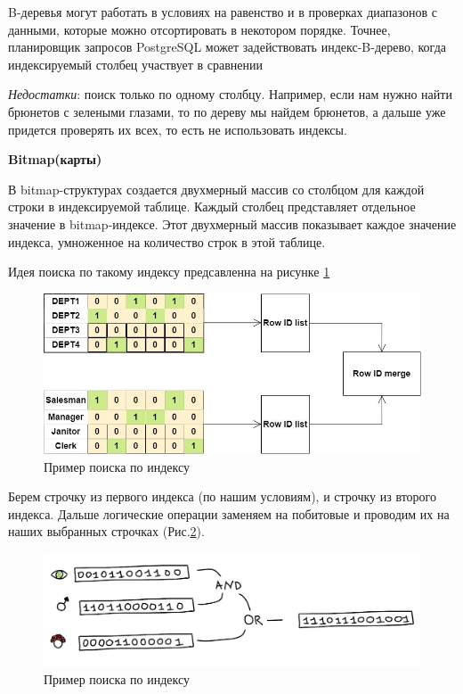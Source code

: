 B-деревья могут работать в условиях на равенство и в проверках диапазонов с данными, которые можно отсортировать в некотором порядке. Точнее, планировщик запросов PostgreSQL может задействовать индекс-B-дерево, когда индексируемый столбец участвует в сравнении 

\textit{Недостатки}: поиск только по одному столбцу. Например, если нам нужно найти брюнетов с зелеными глазами, то по дереву мы найдем брюнетов, а дальше уже придется проверять их всех, то есть не использовать индексы. 

\textbf{Bitmap(карты)} 

В bitmap-структурах создается двухмерный массив со столбцом для каждой строки в индексируемой таблице. Каждый столбец представляет отдельное значение в bitmap-индексе. Этот двухмерный массив показывает каждое значение индекса, умноженное на количество строк в этой таблице.

Идея поиска по такому индексу предсавленна на рисунке \ref{fig:Map}  

\begin{figure}[!h]
    \centering
    \includegraphics[scale = 0.5]{4/Index.jpg}
    \caption{Пример поиска по индексу}
    \label{fig:Map}
\end{figure}


Берем строчку из первого индекса (по нашим условиям), и строчку из второго индекса. Дальше логические операции заменяем на побитовые и проводим их на наших выбранных строчках (Рис.\ref{fig:BMap}).

\begin{figure}[!h]
    \centering
    \includegraphics[scale = 0.4]{4/BitMat.png}
    \caption{Пример поиска по индексу}
    \label{fig:BMap}
\end{figure}

